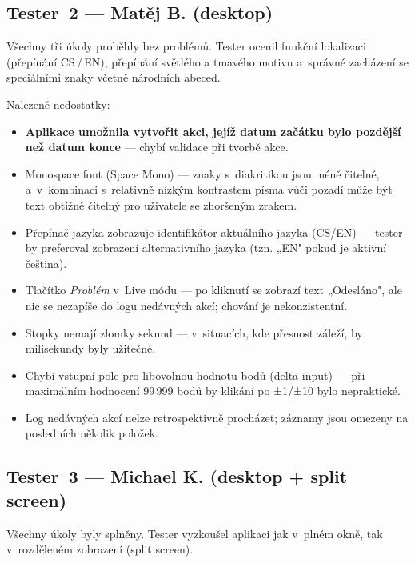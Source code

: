 ﻿\documentclass[a4paper,12pt]{article}
\begin{document}
\subsection{Tester~2 — Matěj B. (desktop)}

Všechny tři úkoly proběhly bez problémů. Tester ocenil funkční lokalizaci
(přepínání CS\,/\,EN), přepínání světlého a tmavého motivu a~správné
zacházení se speciálními znaky včetně národních abeced.

Nalezené nedostatky:

\begin{itemize}
  \item \textbf{Aplikace umožnila vytvořit akci, jejíž datum začátku bylo
    pozdější než datum konce} — chybí validace při tvorbě akce.
  \item Monospace font (Space Mono) — znaky s~diakritikou jsou méně čitelné,
    a~v~kombinaci s~relativně nízkým kontrastem písma vůči pozadí může být
    text obtížně čitelný pro uživatele se zhoršeným zrakem.
  \item Přepínač jazyka zobrazuje identifikátor aktuálního jazyka (CS/EN) —
    tester by preferoval zobrazení alternativního jazyka (tzn. „EN" pokud je
    aktivní čeština).
  \item Tlačítko \emph{Problém} v~Live módu — po kliknutí se zobrazí text
    „Odesláno", ale nic se nezapíše do logu nedávných akcí; chování je
    nekonzistentní.
  \item Stopky nemají zlomky sekund — v~situacích, kde přesnost záleží, by
    milisekundy byly užitečné.
  \item Chybí vstupní pole pro libovolnou hodnotu bodů (delta input) — při
    maximálním hodnocení 99\,999 bodů by klikání po ±1/±10 bylo nepraktické.
  \item Log nedávných akcí nelze retrospektivně procházet; záznamy jsou
    omezeny na posledních několik položek.
\end{itemize}

\subsection{Tester~3 — Michael K. (desktop + split screen)}

Všechny úkoly byly splněny. Tester vyzkoušel aplikaci jak v~plném okně, tak
v~rozděleném zobrazení (split screen).
\end{document}
